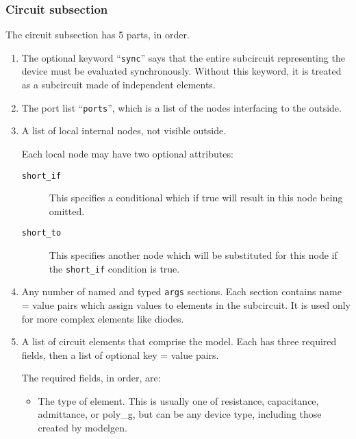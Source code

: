 \subsubsection{Circuit subsection}

The circuit subsection has 5 parts, in order.

\begin{enumerate}

\item
The optional keyword ``{\tt sync}'' says that the entire subcircuit
representing the device must be evaluated synchronously.  Without this
keyword, it is treated as a subcircuit made of independent elements.

\item
The port list ``{\tt ports}'', which is a list of the nodes
interfacing to the outside.

\item
A list of local internal nodes, not visible outside.

Each local node may have two optional attributes:

\begin{description}

\item[{\tt short\_if}]
This specifies a conditional which if true will result in this node
being omitted.

\item[{\tt short\_to}]
This specifies another node which will be substituted for this node if
the {\tt short\_if} condition is true.

\end{description}

\item
Any number of named and typed {\tt args} sections.  Each section
contains name = value pairs which assign values to elements in the
subcircuit.  It is used only for more complex elements like diodes.

\item
A list of circuit elements that comprise the model.  Each has three
required fields, then a list of optional key = value pairs.

The required fields, in order, are:

\begin{itemize}

\item
The type of element.  This is usually one of resistance, capacitance,
admittance, or poly\_g, but can be any device type, including those
created by modelgen.


\end{itemize}
\end{enumerate}
